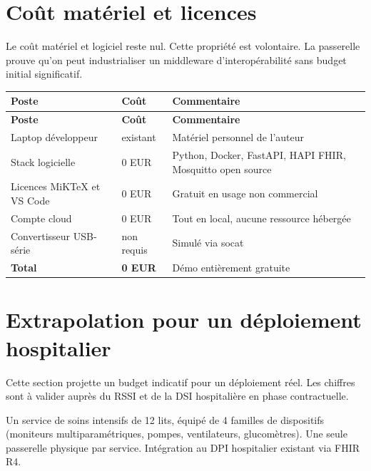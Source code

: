 \section{Coût matériel et licences}
\label{sec:budget-materiel}

Le coût matériel et logiciel reste nul. Cette propriété est volontaire. La passerelle prouve qu'on peut industrialiser un middleware d'interopérabilité sans budget initial significatif.

\bridgezebra
\begin{longtable}{p{4.5cm}p{2.5cm}p{7cm}}
  \toprule
  \rowcolor{bridgeblue!90}
  {\color{white}\bfseries Poste} & {\color{white}\bfseries Coût} & {\color{white}\bfseries Commentaire} \\
  \midrule
  \endfirsthead
  \toprule
  \rowcolor{bridgeblue!90}
  {\color{white}\bfseries Poste} & {\color{white}\bfseries Coût} & {\color{white}\bfseries Commentaire} \\
  \midrule
  \endhead
  \bottomrule
  \endfoot
  Laptop développeur            & existant   & Matériel personnel de l'auteur \\
  Stack logicielle              & 0 EUR      & Python, Docker, FastAPI, HAPI FHIR, Mosquitto open source \\
  Licences MiKTeX et VS Code    & 0 EUR      & Gratuit en usage non commercial \\
  Compte cloud                  & 0 EUR      & Tout en local, aucune ressource hébergée \\
  Convertisseur USB-série       & non requis & Simulé via socat \\
  \textbf{Total}                & \textbf{0 EUR} & Démo entièrement gratuite \\
\end{longtable}

\section{Extrapolation pour un déploiement hospitalier}
\label{sec:budget-extrapolation-prod}

Cette section projette un budget indicatif pour un déploiement réel. Les chiffres sont à valider auprès du RSSI et de la DSI hospitalière en phase contractuelle.

\begin{bridgenote}
Un service de soins intensifs de 12 lits, équipé de 4 familles de dispositifs (moniteurs multiparamétriques, pompes, ventilateurs, glucomètres). Une seule passerelle physique par service. Intégration au DPI hospitalier existant via FHIR R4.
\end{bridgenote}

